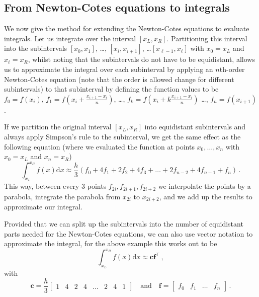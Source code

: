 \subsection{From Newton-Cotes equations to integrals}
\label{newton_cotes_integrals}
We now give the method for extending the Newton-Cotes equations to evaluate integrals.
Let us integrate over the interval $[x_L, x_R]$.
Partitioning this interval into the subintervals $[x_0, x_1]$, \dots, $[x_i, x_{i+1}]$, \dots $[x_{\ell-1}, x_{\ell}]$ with $x_0 = x_L$ and $x_\ell = x_R$, whilst noting that the subintervals do not have to be equidistant, allows us to approximate the integral over each subinterval by applying an $n$th-order Newton-Cotes equation (note that the order is allowed change for different subintervals) to that subinterval by defining the function values to be $f_0=f(x_i)$, $f_1 = f(x_i+\frac{x_{i+1}-x_i}{n})$, \dots, $f_k = f(x_i + k\frac{x_{i+1}-x_i}{n})$ \dots, $f_n = f(x_{i+1})$.

If we partition the original interval $[x_L, x_R]$ into equidistant subintervals and always apply Simpson's rule to the subinterval, we get the same effect as the following equation (where we evaluated the function at points $x_0, \dots, x_n$ with $x_0=x_L$ and $x_n = x_R$)
\begin{equation}
    \int_{x_L}^{x_R} f(x) \mathrm d x \approx \frac{h}{3}(f_0 + 4 f_1 + 2 f_2 + 4f_3 + \dots + 2 f_{n-2} + 4 f_{n-1} + f_n) \,.\nonumber
\end{equation}
This way, between every $3$ points $f_{2i}, f_{2i+1}, f_{2i+2}$ we interpolate the points by a parabola, integrate the parabola from $x_{2i}$ to $x_{2i+2}$, and we add up the results to approximate our integral.

Provided that we can split up the subintervals into the number of equidistant parts needed for the Newton-Cotes equations, we can also use vector notation to approximate the integral, for the above example this works out to be
\begin{equation}
    \int_{x_L}^{x_R} f(x) \mathrm d x \approx \mathbf c\mathbf f^\top \,,\nonumber
\end{equation}
with
\begin{equation}
    \mathbf c = \frac{h}{3}\begin{bmatrix}1&4&2&4&\dots&2&4&1\end{bmatrix}\quad \textrm{and} \quad
    \mathbf f = \begin{bmatrix}f_0&f_1&\dots&f_n\end{bmatrix} \,. \label{eq:vectors}
\end{equation}


